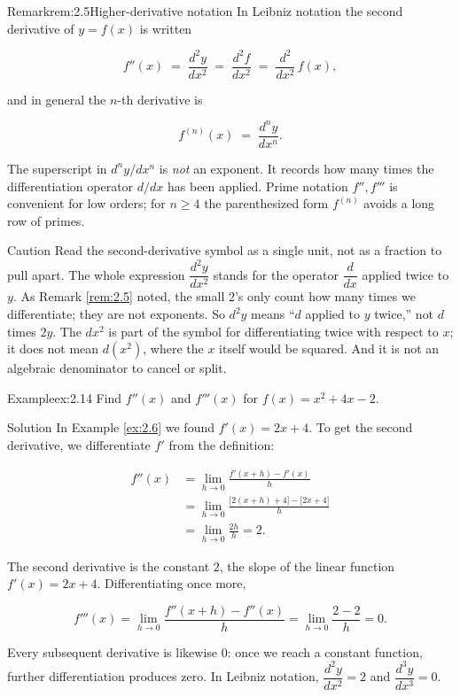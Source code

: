 \documentclass[a4paper,12pt,oneside]{memoir}
\begin{document}
\begin{envremark}{Remark}{rem:2.5}{Higher-derivative notation}
In Leibniz notation the second derivative of \(y = f(x)\) is written

\[ f''(x) \;=\; \frac{d^{2}y}{dx^{2}} \;=\; \frac{d^{2}f}{dx^{2}} \;=\; \frac{d^{2}}{dx^{2}}\,f(x), \]

and in general the \(n\)-th derivative is

\[ f^{(n)}(x) \;=\; \frac{d^{n}y}{dx^{n}}. \]

The superscript in \(d^{n}y/dx^{n}\) is \emph{not} an exponent. It records how many times the differentiation operator \(d/dx\) has been applied. Prime notation \(f'', f'''\) is convenient for low orders; for \(n \ge 4\) the parenthesized form \(f^{(n)}\) avoids a long row of primes.
\end{envremark}
\begin{envcaution}{Caution}{}{}
Read the second-derivative symbol as a single unit, not as a fraction to pull apart. The whole expression \(\dfrac{d^{2}y}{dx^{2}}\) stands for the operator \(\dfrac{d}{dx}\) applied twice to \(y\). As Remark \ref{rem:2.5} noted, the small \(2\)’s only count how many times we differentiate; they are not exponents. So \(d^{2}y\) means “\(d\) applied to \(y\) twice,” not \(d\) times \(2y\). The \(dx^{2}\) is part of the symbol for differentiating twice with respect to \(x\); it does not mean \(d(x^{2})\), where the \(x\) itself would be squared. And it is not an algebraic denominator to cancel or split.
\end{envcaution}
\begin{workedexample}
\begin{envexample}{Example}{ex:2.14}{}
Find \(f''(x)\) and \(f'''(x)\) for \(f(x) = x^{2} + 4x - 2\).
\end{envexample}
\begin{envsolution}{Solution}{}{}
In Example \ref{ex:2.6} we found \(f'(x) = 2x + 4\). To get the second derivative, we differentiate \(f'\) from the definition:

\[ \begin{aligned}
          f''(x) &= \lim_{h \to 0} \frac{f'(x + h) - f'(x)}{h} \\[2pt]
                 &= \lim_{h \to 0} \frac{\bigl[2(x + h) + 4\bigr] - \bigl[2x + 4\bigr]}{h} \\[2pt]
                 &= \lim_{h \to 0} \frac{2h}{h} = 2.
        \end{aligned} \]

The second derivative is the constant \(2\), the slope of the linear function \(f'(x) = 2x + 4\). Differentiating once more,

\[ f'''(x) = \lim_{h \to 0} \frac{f''(x + h) - f''(x)}{h} = \lim_{h \to 0} \frac{2 - 2}{h} = 0. \]

Every subsequent derivative is likewise \(0\): once we reach a constant function, further differentiation produces zero. In Leibniz notation, \(\dfrac{d^{2}y}{dx^{2}} = 2\) and \(\dfrac{d^{3}y}{dx^{3}} = 0\).
\end{envsolution}
\end{workedexample}
\end{document}
